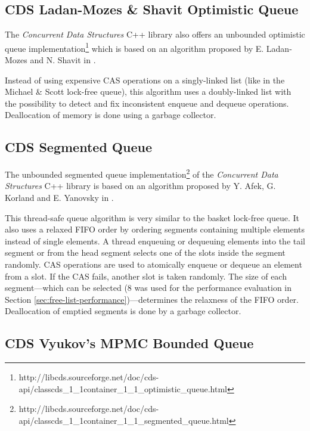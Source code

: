 \subsection[CDS OptimisticQueue]{CDS Ladan-Mozes \& Shavit Optimistic Queue} \label{subsec:cds-optimistic}

	The \textit{Concurrent Data Structures} C++ library also offers an unbounded optimistic queue implementation\footnote{http://libcds.sourceforge.net/doc/cds-api/classcds\_1\_1container\_1\_1\_optimistic\_queue.html} which is based on an algorithm proposed by E. Ladan-Mozes and N. Shavit in \cite{Ladan-Mozes:2004}.
	
	Instead of using expensive CAS operations on a singly-linked list (like in the Michael \& Scott lock-free queue), this algorithm uses a doubly-linked list with the possibility to detect and fix inconsistent enqueue and dequeue operations. Deallocation of memory is done using a garbage collector.

\subsection[CDS SegmentedQueue]{CDS Segmented Queue} \label{subsec:cds-segmented}

	The unbounded segmented queue implementation\footnote{http://libcds.sourceforge.net/doc/cds-api/classcds\_1\_1container\_1\_1\_segmented\_queue.html} of the \textit{Concurrent Data Structures} C++ library is based on an algorithm proposed by Y. Afek, G. Korland and E. Yanovsky in \cite{Afek:2010}.
	
	This thread-safe queue algorithm is very similar to the basket lock-free queue. It also uses a relaxed FIFO order by ordering segments containing multiple elements instead of single elements. A thread enqueuing or dequeuing elements into the tail segment or from the head segment selects one of the slots inside the segment randomly. CAS operations are used to atomically enqueue or dequeue an element from a slot. If the CAS fails, another slot is taken randomly. The size of each segment---which can be selected ($8$ was used for the performance evaluation in Section \ref{sec:free-list-performance})---determines the relaxness of the FIFO order. Deallocation of emptied segments is done by a garbage collector.

\subsection[CDS VyukovMPMCCycleQueue]{CDS Vyukov's MPMC Bounded Queue} \label{subsec:cds-vyukovmpmccycle}

